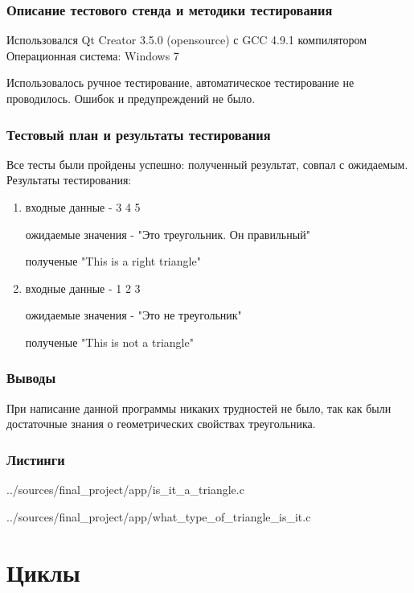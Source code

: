 \documentclass[12pt,a4paper]{report}
\begin{document}
\subsection{Описание тестового стенда и методики тестирования}

Использовался Qt Creator 3.5.0 (opensource) с GCC 4.9.1 компилятором
Операционная система: Windows 7

Использовалось ручное тестирование, автоматическое тестирование не проводилось.
Ошибок и предупреждений не было.
\subsection{Тестовый план и результаты тестирования}

Все тесты были пройдены успешно: полученный результат, совпал с ожидаемым. Результаты тестирования:

\begin{enumerate}
\item входные данные - 3 4 5

ожидаемые значения - "Это треугольник. Он правильный"

полученые "This is a right triangle"
\item входные данные - 1 2 3

ожидаемые значения - "Это не треугольник"

полученые "This is not a triangle"
\end{enumerate}


\subsection{Выводы}

При написание данной программы никаких трудностей не было, так как были достаточные знания о геометрических свойствах треугольника.
\subsection*{Листинги}


{../sources/final_project/app/is_it_a_triangle.c}

{../sources/final_project/app/what_type_of_triangle_is_it.c}

\chapter{Циклы}
\end{document}
